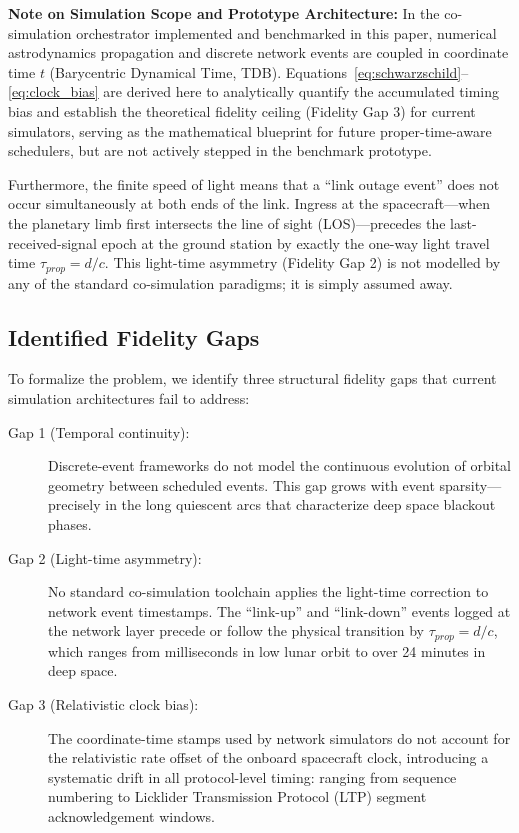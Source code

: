 \documentclass[a4paper,fleqn]{cas-sc}
\begin{document}
{\noindent\textbf{Note on Simulation Scope and Prototype Architecture:} In the co-simulation orchestrator implemented and benchmarked in this paper, numerical astrodynamics propagation and discrete network events are coupled in coordinate time $t$ (Barycentric Dynamical Time, TDB). Equations~\eqref{eq:schwarzschild}--\eqref{eq:clock_bias} are derived here to analytically quantify the accumulated timing bias and establish the theoretical fidelity ceiling (Fidelity Gap 3) for current simulators, serving as the mathematical blueprint for future proper-time-aware schedulers, but are not actively stepped in the benchmark prototype.

Furthermore, the finite speed of light means that a ``link outage event'' does not occur simultaneously at both ends of the link. Ingress at the spacecraft---when the planetary limb first intersects the line of sight (LOS)---precedes the last-received-signal epoch at the ground station by exactly the one-way light travel time $\tau_{prop} = d/c$. This light-time asymmetry (Fidelity Gap 2) is not modelled by any of the standard co-simulation paradigms; it is simply assumed away.}

\subsection{Identified Fidelity Gaps}
To formalize the problem, we identify three structural fidelity gaps that current simulation architectures fail to address:

\begin{description}
    \item[Gap 1 (Temporal continuity):] Discrete-event frameworks do not model the continuous evolution of orbital geometry between scheduled events. This gap grows with event sparsity---precisely in the long quiescent arcs that characterize deep space blackout phases.
    \item[Gap 2 (Light-time asymmetry):] No standard co-simulation toolchain applies the light-time correction to network event timestamps. The ``link-up'' and ``link-down'' events logged at the network layer precede or follow the physical transition by $\tau_{prop} = d/c$, which ranges from milliseconds in low lunar orbit to over 24 minutes in deep space.
    \item[Gap 3 (Relativistic clock bias):] The coordinate-time stamps used by network simulators do not account for the relativistic rate offset of the onboard spacecraft clock, introducing a systematic drift in all protocol-level timing: ranging from sequence numbering to Licklider Transmission Protocol (LTP) segment acknowledgement windows.
\end{description}
\end{document}

